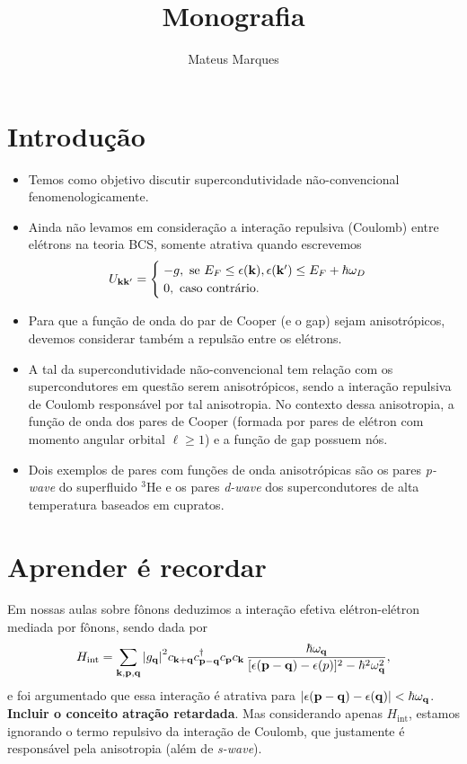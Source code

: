 \documentclass[a4paper,10pt]{article}
\title{\Huge{\textbf{Monografia}}}
\author{Mateus Marques}
\begin{document}
\maketitle

\section{Introdução}

\begin{itemize}
\item Temos como objetivo discutir supercondutividade não-convencional fenomenologicamente.
\item Ainda não levamos em consideração a interação repulsiva (Coulomb) entre elétrons na teoria BCS, somente atrativa quando escrevemos
$$
U_{\vb{k}\vb{k}'} =
\begin{cases}
\; -g, \text{ se } E_F \leq \epsilon(\vb{k}), \epsilon(\vb{k}') \leq E_F + \hbar \omega_D \\
\; 0, \text{ caso contrário.}
\end{cases}
$$
\item Para que a função de onda do par de Cooper (e o gap) sejam anisotrópicos, devemos considerar também a repulsão entre os elétrons.
\item A tal da supercondutividade não-convencional tem relação com os supercondutores em questão serem anisotrópicos, sendo a interação repulsiva de Coulomb responsável por tal anisotropia. No contexto dessa anisotropia, a função de onda dos pares de Cooper (formada por pares de elétron com momento angular orbital $\ell \geq 1$) e a função de gap possuem nós.
\item Dois exemplos de pares com funções de onda anisotrópicas são os pares \textit{p-wave} do superfluido $^3$He e os pares \textit{d-wave} dos supercondutores de alta temperatura baseados em cupratos.
\end{itemize}

\section{Aprender é recordar}

Em nossas aulas sobre fônons deduzimos a interação efetiva elétron-elétron mediada por fônons, sendo dada por
$$
H_{\text{int}} = \sum_{\vb{k},\vb{p},\vb{q}} \abs{g_{\vb{q}}}^2 c_{\vb{k}+\vb{q}} c_{\vb{p}-\vb{q}}^\dagger c_{\vb{p}} c_{\vb{k}} \,
\frac{\hbar \omega_{\vb{q}}}{[\epsilon(\vb{p}-\vb{q}) - \epsilon(p)]^2 - \hbar^2 \omega_{\vb{q}}^2},
$$
e foi argumentado que essa interação é atrativa para $\abs{\epsilon(\vb{p}-\vb{q}) - \epsilon(\vb{q})} < \hbar \omega_{\vb{q}}$. \textbf{Incluir o conceito atração retardada}. Mas considerando apenas $H_{\text{int}}$, estamos ignorando o termo repulsivo da interação de Coulomb, que justamente é responsável pela anisotropia (além de \textit{s-wave}).
\end{document}

